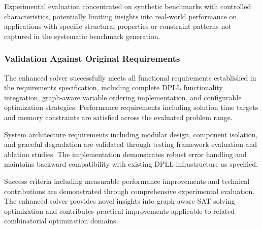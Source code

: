 Experimental evaluation concentrated on synthetic benchmarks with controlled characteristics, potentially limiting insights into real-world performance on applications with specific structural properties or constraint patterns not captured in the systematic benchmark generation.

\subsubsection{Validation Against Original Requirements}

The enhanced solver successfully meets all functional requirements established in the requirements specification, including complete DPLL functionality integration, graph-aware variable ordering implementation, and configurable optimization strategies. Performance requirements including solution time targets and memory constraints are satisfied across the evaluated problem range.

System architecture requirements including modular design, component isolation, and graceful degradation are validated through testing framework evaluation and ablation studies. The implementation demonstrates robust error handling and maintains backward compatibility with existing DPLL infrastructure as specified.

Success criteria including measurable performance improvements and technical contributions are demonstrated through comprehensive experimental evaluation. The enhanced solver provides novel insights into graph-aware SAT solving optimization and contributes practical improvements applicable to related combinatorial optimization domains.